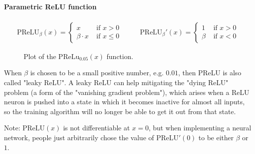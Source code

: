 \documentclass[titlepage]{article}
\begin{document}
        \paragraph{Parametric ReLU function}

          \begin{align*}
            \text{PReLU}_\beta (x) =
              \begin{cases}
                x & \text{ if } x > 0 \\
                \beta \cdot x & \text{ if } x \leq 0
              \end{cases}
            & \quad &
            \text{PReLU}_\beta' (x) =
              \begin{cases}
                1 & \text{ if } x > 0 \\
                \beta & \text{ if } x < 0
              \end{cases}
          \end{align*}

          \begin{figure}[!htb]
            \centering
            \caption{%
              Plot of the $\text{PReLu}_{0.05}(x)$ function.
            }
          \end{figure}

          When $\beta$ is chosen to be a small positive number, e.g. $0.01$,
          then PReLU is also called "leaky ReLU". A leaky ReLU can help
          mitigating the "dying ReLU" problem (a form of the "vanishing gradient
          problem"), which arises when a ReLU neuron is pushed into a state in
          which it becomes inactive for almost all inputs, so the training
          algorithm will no longer be able to get it out from that state.

          Note: $\text{PReLU}(x)$ is not differentiable at $x=0$, but when
          implementing a neural network, people just arbitrarily chose the value
          of $\text{PReLU}'(0)$ to be either $\beta$ or $1$.
\end{document}
